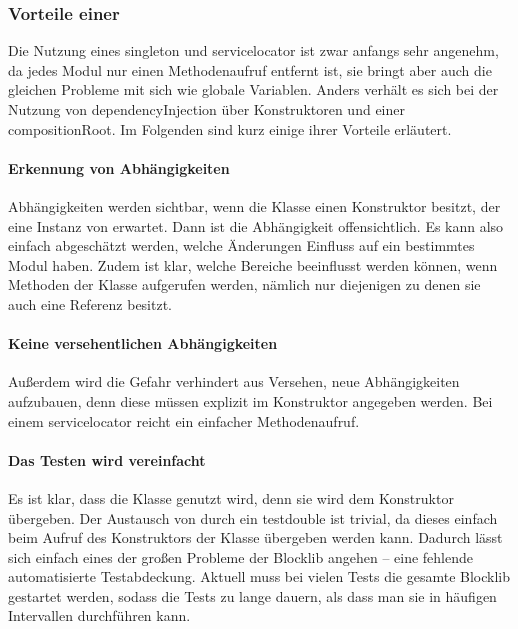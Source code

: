 \subsubsection{Vorteile einer }

Die Nutzung eines \gls{singleton} und \gls{servicelocator} ist zwar anfangs sehr angenehm, da jedes Modul nur einen Methodenaufruf entfernt ist, sie bringt aber auch die gleichen Probleme mit sich wie globale Variablen. Anders verhält es sich bei der Nutzung von \gls{dependencyInjection} über Konstruktoren und einer \gls{compositionRoot}. Im Folgenden sind kurz einige ihrer Vorteile erläutert.

\paragraph{Erkennung von Abhängigkeiten}Abhängigkeiten werden sichtbar, wenn die Klasse einen Konstruktor besitzt, der eine Instanz von  erwartet. Dann ist die Abhängigkeit offensichtlich. Es kann also einfach abgeschätzt werden, welche Änderungen Einfluss auf ein bestimmtes Modul haben. Zudem ist klar, welche Bereiche beeinflusst werden können, wenn Methoden der Klasse aufgerufen werden, nämlich nur diejenigen zu denen sie auch eine Referenz besitzt.

\paragraph{Keine versehentlichen Abhängigkeiten} Außerdem wird die Gefahr verhindert aus Versehen, neue Abhängigkeiten aufzubauen, denn diese müssen explizit im Konstruktor angegeben werden. Bei einem \gls{servicelocator} reicht ein einfacher Methodenaufruf.

\paragraph{Das Testen wird vereinfacht} Es ist klar, dass die Klasse  genutzt wird, denn sie wird dem Konstruktor übergeben. Der Austausch von  durch ein \gls{testdouble} ist trivial, da dieses einfach beim Aufruf des Konstruktors der Klasse übergeben werden kann. Dadurch lässt sich einfach eines der großen Probleme der Blocklib angehen -- eine fehlende automatisierte Testabdeckung. Aktuell muss bei vielen Tests die gesamte Blocklib gestartet werden, sodass die Tests zu lange dauern, als dass man sie in häufigen Intervallen durchführen kann.

